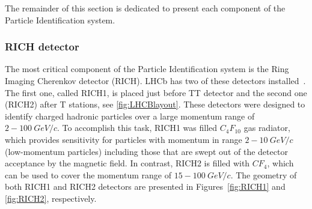 The remainder of this section is dedicated to present each component of the Particle Identification system.


\subsubsection{RICH detector}

The most critical component of the Particle Identification system is the Ring Imaging Cherenkov detector (RICH). LHCb has two of these detectors installed~\cite{RICH_performance}. The first one, called RICH1, is placed just before TT detector and the second one (RICH2) after T stations, see \ref{fig:LHCBlayout}. These detectors were designed to identify charged hadronic particles over a large momentum range of $2-100~ GeV/c$. To accomplish this task, RICH1 was filled $C_4F_{10}$ gas radiator, which provides sensitivity for particles with momentum in range $2-10~ GeV/c$ (low-momentum particles) including those that are swept out of the detector acceptance by the magnetic field. In contrast, RICH2 is filled with $CF_4$, which can be used to cover the momentum range of $15-100~ GeV/c$. The geometry of both RICH1 and RICH2 detectors are presented in Figures~\ref{fig:RICH1} and \ref{fig:RICH2}, respectively. 


